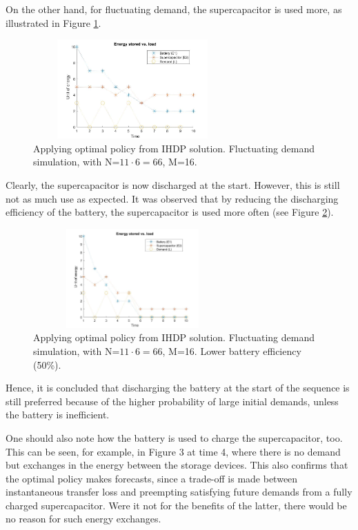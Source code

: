 \documentclass[conference]{IEEEtran}
\begin{document}
On the other hand, for fluctuating demand, the supercapacitor is used more, as illustrated in Figure \ref{fig:FluctuatingDemand}.
\begin{figure}[htbp]
\centerline{\includegraphics[width=3in,height=1.5in]{EnergyStoredvsFluctuatingLoad(E1=10,E2=5).jpg}}
\caption{Applying optimal policy from IHDP solution. Fluctuating demand simulation, with N=$11\cdot6=66$, M=16.}
\label{fig:FluctuatingDemand}
\end{figure} Clearly, the supercapacitor is now discharged at the start. However, this is still not as much use as expected. It was observed that by reducing the discharging efficiency of the battery, the supercapacitor is used more often (see Figure \ref{fig:FluctuatingDemand_LowBattEff}).
\begin{figure}[htbp]
\centerline{\includegraphics[width=3in,height=1.5in]{EnergyStoredvsFluctuatingLoad_LowBattEff(E1=10,E2=5).jpg}}
\caption{Applying optimal policy from IHDP solution. Fluctuating demand simulation, with N=$11\cdot6=66$, M=16. Lower battery efficiency (50\%).}
\label{fig:FluctuatingDemand_LowBattEff}
\end{figure} Hence, it is concluded that discharging the battery at the start of the sequence is still preferred because of the higher probability of large initial demands, unless the battery is inefficient.

One should also note how the battery is used to charge the supercapacitor, too. This can be seen, for example, in Figure 3 at time 4, where there is no demand but exchanges in the energy between the storage devices. This also confirms that the optimal policy makes forecasts, since a trade-off is made between instantaneous transfer loss and preempting satisfying future demands from a fully charged supercapacitor. Were it not for the benefits of the latter, there would be no reason for such energy exchanges.
\end{document}
